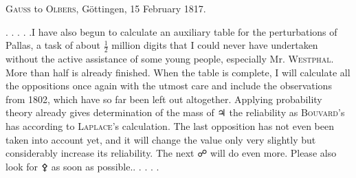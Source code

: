 \par{}\bigskip
\begin{center}
\textsc{Gauss} to \textsc{Olbers}, Göttingen, 15 February 1817.
\end{center}
\noindent\hspace*{\parindent}. . . . .\quad I have also begun to calculate an auxiliary table for the perturbations of Pallas, a task of about \(\frac{1}{2}\) million digits that I could never have undertaken without the active assistance of some young people, especially Mr. \textsc{Westphal}. More than half is already finished. When the table is complete, I will calculate all the oppositions once again with the utmost care and include the observations from 1802, which have so far been left out altogether. Applying probability theory already gives  determination of the mass of {\AstroSymbols ♃} the  reliability as \textsc{Bouvard}'s has according to \textsc{Laplace}'s calculation. The last opposition has not even been taken into account yet, and it will change the value only very slightly but considerably increase its reliability. The next {\AstroSymbols ☍} will do even more. Please also look for {\AstroSymbols ⚴} as soon as possible.\quad . . . . .
\par
